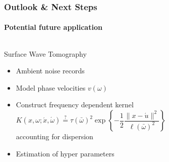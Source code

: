\documentclass[aspectratio=169, t, 10pt, ignorenonframetext]{beamer}
\begin{document}
\begin{frame}
    \frametitle{Outlook \& Next Steps }
    \framesubtitle{Potential future application}

\begin{columns}
%

    \begin{block}{Surface Wave Tomography}
        \begin{itemize}
            \item Ambient noise records
            \item Model phase velocities $v(\omega)$
            \item Construct frequency dependent kernel
                \begin{equation}
                    K(x,\omega; \acute x, \acute\omega) \overset{?}{=}
                    \tau(\bar \omega)^2 \exp\left\{ -\frac12 \frac{\|x - \acute u\|^2}{\ell(\bar \omega)^2}\right\}
                \end{equation}
                accounting for dispersion
            \item Estimation of hyper parameters
        \end{itemize}
    \end{block}


\end{columns}
\end{frame}
\end{document}
